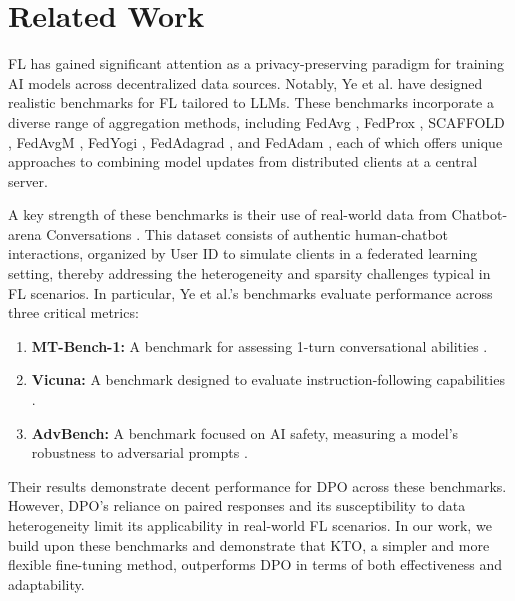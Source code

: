 \section{Related Work}
\label{sec:related}

FL has gained significant attention as a privacy-preserving paradigm for training AI models across decentralized data sources. Notably, Ye et al. \cite{ye2024openfedllm, ye2024fedllm} have designed realistic benchmarks for FL tailored to LLMs. These benchmarks incorporate a diverse range of aggregation methods, including FedAvg \cite{mcmahan2017communication}, FedProx \cite{li2020federated}, SCAFFOLD \cite{karimireddy2020scaffold}, FedAvgM \cite{hsu2019measuring}, FedYogi \cite{reddiadaptive}, FedAdagrad \cite{reddiadaptive}, and FedAdam \cite{reddiadaptive}, each of which offers unique approaches to combining model updates from distributed clients at a central server.

A key strength of these benchmarks is their use of real-world data from Chatbot-arena Conversations \cite{zheng2023judging}. This dataset consists of authentic human-chatbot interactions, organized by User ID to simulate clients in a federated learning setting, thereby addressing the heterogeneity and sparsity challenges typical in FL scenarios. 
In particular, Ye et al.'s benchmarks evaluate performance across three critical metrics: 
\begin{enumerate}
    \item \textbf{MT-Bench-1:} A benchmark for assessing 1-turn conversational abilities \cite{zheng2023judging}.
    \item \textbf{Vicuna:} A benchmark designed to evaluate instruction-following capabilities \cite{chiang2023vicuna}.
    \item \textbf{AdvBench:} A benchmark focused on AI safety, measuring a model’s robustness to adversarial prompts \cite{zou2023universal}.
\end{enumerate}

Their results demonstrate decent performance for DPO across these benchmarks. However, DPO's reliance on paired responses and its susceptibility to data heterogeneity limit its applicability in real-world FL scenarios. In our work, we build upon these benchmarks and demonstrate that KTO, a simpler and more flexible fine-tuning method, outperforms DPO in terms of both effectiveness and adaptability. 

%